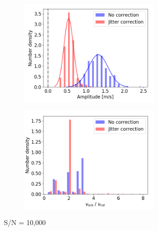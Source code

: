 \begin{figure}[tbp]	
    \begin{subfigure}[b]{1.0\textwidth}
    		\begin{subfigure}[b]{0.49\textwidth}
        		\includegraphics[width=\textwidth]{./Figures/Methods/Histogram_new1_null_10000.png}
        \end{subfigure}
        \begin{subfigure}[b]{0.49\textwidth}
        		\includegraphics[width=\textwidth]{./Figures/Methods/Histogram_new2_null_10000.png}
        \end{subfigure}
        \caption{S/N = 10,000}
    \end{subfigure}
    \begin{subfigure}[b]{1.0\textwidth}

\end{subfigure}
\end{figure}

